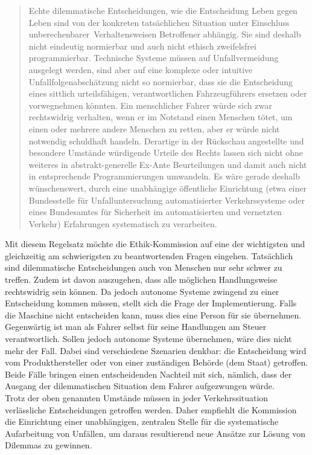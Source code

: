 \documentclass[twoside,a4paper,12pt]{article}
\begin{document}
\begin{quote}
\glqq
Echte dilemmatische Entscheidungen, wie die Entscheidung Leben gegen Leben sind von
der konkreten tatsächlichen Situation unter Einschluss \glqq unberechenbarer\grqq\ Verhaltensweisen Betroffener abhängig. 
Sie sind deshalb nicht eindeutig normierbar und auch nicht
ethisch zweifelsfrei programmierbar. Technische Systeme müssen auf Unfallvermeidung
ausgelegt werden, sind aber auf eine komplexe oder intuitive Unfallfolgenabschätzung
nicht so normierbar, dass sie die Entscheidung eines sittlich urteilsfähigen, verantwortlichen Fahrzeugführers ersetzen 
oder vorwegnehmen könnten. Ein menschlicher Fahrer
würde sich zwar rechtswidrig verhalten, wenn er im Notstand einen Menschen tötet, um
einen oder mehrere andere Menschen zu retten, aber er würde nicht notwendig schuldhaft handeln. Derartige in der Rückschau 
angestellte und besondere Umstände würdigende Urteile des Rechts lassen sich nicht ohne weiteres in abstrakt-generelle 
Ex-Ante Beurteilungen und damit auch nicht in entsprechende Programmierungen umwandeln.
Es wäre gerade deshalb wünschenswert, durch eine unabhängige öffentliche Einrichtung
(etwa einer Bundesstelle für Unfalluntersuchung automatisierter Verkehrssysteme oder
eines Bundesamtes für Sicherheit im automatisierten und vernetzten Verkehr) Erfahrungen systematisch zu verarbeiten.\grqq\mbox{~\cite[S. 11]{ek}}
\end{quote}

Mit diesem Regelsatz möchte die Ethik-Kommission auf eine der wichtigsten und gleichzeitig am schwierigsten zu beantwortenden Fragen eingehen. Tatsächlich sind dilemmatische Entscheidungen auch von Menschen nur sehr schwer zu treffen. Zudem ist davon auszugehen, dass alle möglichen Handlungsweise rechtswidrig sein können.
Da jedoch autonome Systeme zwingend zu einer Entscheidung kommen müssen, stellt sich die Frage der Implementierung. Falls die Maschine nicht entscheiden kann, muss
dies eine Person für sie übernehmen. Gegenwärtig ist man als Fahrer selbst für seine Handlungen am Steuer verantwortlich. Sollen jedoch autonome Systeme übernehmen,
wäre dies nicht mehr der Fall. Dabei sind verschiedene Szenarien denkbar: die Entscheidung wird vom Produkthersteller oder von einer zuständigen Behörde (dem Staat) getroffen. Beide Fälle bringen einen entscheidenden Nachteil mit sich, nämlich, dass der Ausgang der dilemmatischen Situation dem Fahrer aufgezwungen würde. \\

Trotz der oben genannten Umstände müssen in jeder Verkehrssituation verlässliche Entscheidungen getroffen werden. Daher empfiehlt die Kommission die Einrichtung 
einer unabhängigen, zentralen Stelle für die systematische Aufarbeitung von Unfällen, um daraus resultierend neue Ansätze zur Lösung von Dilemmas zu gewinnen.\\
\end{document}
